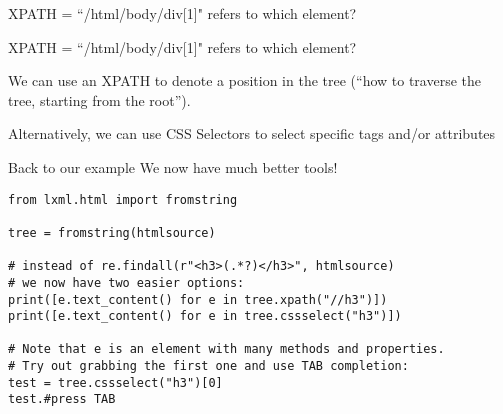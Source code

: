 {
  \begin{frame}[plain]
  \end{frame}
  \begin{frame}[plain]
  \end{frame}
  \begin{frame}[plain]
  \end{frame}
  \begin{frame}[plain]
  \end{frame}
  \begin{frame}[plain]
    XPATH = ``/html/body/div[1]" refers to which element?
  \end{frame}
  \begin{frame}[plain]
    XPATH = ``/html/body/div[1]" refers to which element?
  \end{frame}
}



\begin{frame}[standout]
We can use an XPATH to denote a position in the tree (``how to traverse the tree, starting from the root'').
\end{frame}


\begin{frame}[standout]
Alternatively, we can use CSS Selectors to select specific tags and/or attributes
\end{frame}



\begin{frame}[fragile]{Back to our example}
We now have much better tools!

\begin{verbatim}
from lxml.html import fromstring

tree = fromstring(htmlsource)

# instead of re.findall(r"<h3>(.*?)</h3>", htmlsource)
# we now have two easier options:
print([e.text_content() for e in tree.xpath("//h3")])
print([e.text_content() for e in tree.cssselect("h3")])

# Note that e is an element with many methods and properties.
# Try out grabbing the first one and use TAB completion:
test = tree.cssselect("h3")[0]
test.#press TAB
\end{verbatim}

\end{frame}



